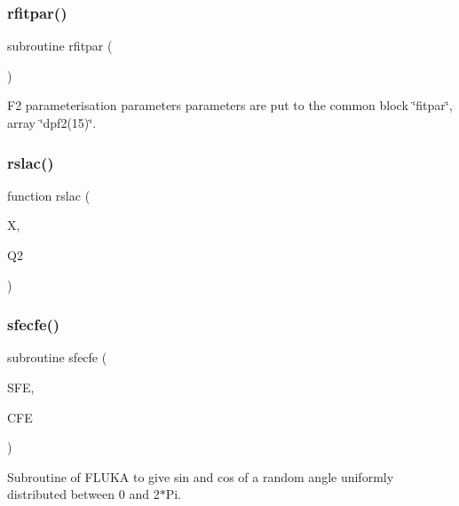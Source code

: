 \mbox{\label{djangoh__h_8f_ac5d143251cf0caaa44dc2183c8ffd5a9}} 
\subsubsection{\texorpdfstring{rfitpar()}{rfitpar()}}
{\footnotesize\ttfamily subroutine rfitpar (\begin{DoxyParamCaption}{ }\end{DoxyParamCaption})}



F2 parameterisation parameters parameters are put to the common block \char`\"{}fitpar\char`\"{}, array \char`\"{}dpf2(15)\char`\"{}. 

\mbox{\label{djangoh__h_8f_aec68a28f044866c5570d11fc901c39f0}} 
\subsubsection{\texorpdfstring{rslac()}{rslac()}}
{\footnotesize\ttfamily function rslac (\begin{DoxyParamCaption}\item[{}]{X,  }\item[{}]{Q2 }\end{DoxyParamCaption})}

\mbox{\label{djangoh__h_8f_a5a653b32b78fa07a92fcdd6c69c0f68d}} 
\subsubsection{\texorpdfstring{sfecfe()}{sfecfe()}}
{\footnotesize\ttfamily subroutine sfecfe (\begin{DoxyParamCaption}\item[{}]{S\+FE,  }\item[{}]{C\+FE }\end{DoxyParamCaption})}



Subroutine of F\+L\+U\+KA to give sin and cos of a random angle uniformly distributed between 0 and 2$\ast$\+Pi. 

